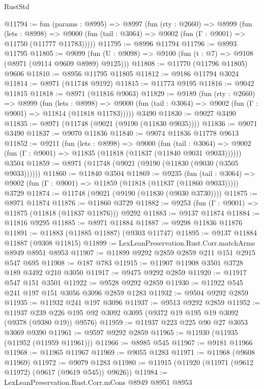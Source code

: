 \begin{lexlean}{RustStd}
\begin{coremodule}
@11794 := fun (params : @8995) =>
  @8997
    (fun (rty : @2660) =>
    @8999
      (fun (lets : @8998) =>
      @9000 (fun (tail : @3064) => @9002 (fun (Γ : @9001) => @11750 (@11777 @11783)))))
@11795 := @8996 @11794
@11796 := @8993 @11795
@11805 := @9099 (fun (U : @9098) => @9100 (fun (t : @7) => @9108 (@8971 (@9114 @9609 @8989) @9125)))
@11808 := @11770 (@11796 @11805) @9606
@11810 := @8956 @11795 @11805
@11812 := @9186 @11794 @3024
@11814 := @8971 (@11748 @9192)
@11815 := @11773 @9195
@11816 := @9042 @11815
@11818 := @8971 (@11816 @9063)
@11829 := @9189
    (fun (rty : @2660) =>
    @8999
      (fun (lets : @8998) =>
      @9000 (fun (tail : @3064) => @9002 (fun (Γ : @9001) => @11814 (@11818 @11783)))))
    @3490
@11830 := @9027 @3490
@11835 := @8971 (@11748 (@9021 (@9190 (@11830 @9035))))
@11836 := @9071 @3490
@11837 := @9070 @11836
@11840 := @9074 @11836 @11778 @9613
@11852 := @9211
    (fun (lets : @8998) =>
    @9000
      (fun (tail : @3064) =>
      @9002 (fun (Γ : @9001) => @11835 (@11818 (@11837 (@11840 @9031 @9033))))))
    @3504
@11859 := @8971 (@11748 (@9021 (@9190 (@11830 (@9030 (@3505 @9033))))))
@11860 := @11840 @3504
@11869 := @9235
    (fun (tail : @3064) => @9002 (fun (Γ : @9001) => @11859 (@11818 (@11837 (@11860 @9033)))))
    @3729
@11874 := @11748 (@9021 (@9190 (@11830 (@9030 @3730))))
@11875 := @8971 @11874
@11876 := @11860 @3729
@11882 := @9253 (fun (Γ : @9001) => @11875 (@11818 (@11837 @11876))) @9292
@11883 := @9137 @11874
@11884 := @11816 @9295
@11885 := @8971 @11884
@11887 := @9298 @11836 @11876
@11891 := @11883 (@11885 @11887) (@9303 @11747)
@11895 := @9137 @11884 @11887 (@9308 @11815)
@11899 := LexLeanPreservation.Rust.Corr.matchArms @8949 @8951 @8953
@11907 := @11899 @9292 @2859 @2859 @211 @151 @2915 @547 @695
@11908 := @187 @783
@11915 := @11907 @11908 @3501 @3728 @189 @3492 @210 @3050
@11917 := @9475 @9292 @2859
@11920 := @11917 @547 @151 @3501
@11922 := @9528 @9292 @2859
@11930 := @11922 @545 @241 @197 @151 @3056 @3096 @2859 @1283
@11932 := @9504 @9292 @2859
@11935 := @11932 @241 @197 @3096
@11937 := @9513 @9292 @2859
@11952 := @11937 @239 @226 @195 @92 @3092 @3095 (@9372 @19 @195 @19 @3092 (@9378 (@9380 @19)) @9576)
@11959 := @11937 @223 @225 @90 @27 @3053 @3069 @9390
@11961 := @9597 @9292 @2859
@11965 := @11930 (@11935 (@11952 (@11959 @11961)))
@11966 := @8985 @545
@11967 := @9181 @11966
@11968 := @11965 @11967
@11969 := @9055 @1283
@11971 := @11968 (@9608 @11969)
@11972 := @9079 @1283
@11980 := @11915 (@11920 (@11971 (@9612 @11972) (@9617 (@9619 @545)) @9626))
@11984 := LexLeanPreservation.Rust.Corr.mCons @8949 @8951 @8953

\end{coremodule}
\end{lexlean}
